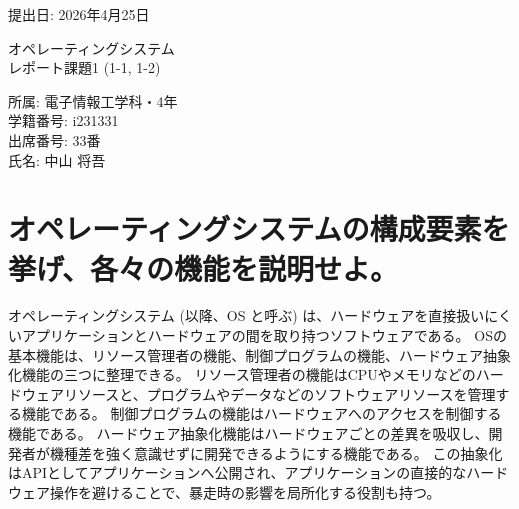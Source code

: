 \documentclass[a4paper,11pt,openany]{ltjsreport}
\begin{document}
\setcounter{page}{1}


% 

\begin{titlepage}
	\begin{flushright}
		{\large 提出日: 2026年4月25日}
	\end{flushright}
	\begin{center}
		{\huge オペレーティングシステム} \\
		\vspace{1cm}
		{\huge レポート課題1 (1-1, 1-2)}
	\end{center}
	\begin{center}
		{\large 所属: 電子情報工学科・4年} \\
		\vspace{0.5cm}
		{\large 学籍番号: i231331} \\
		\vspace{0.5cm}
		{\large 出席番号: 33番} \\
		\vspace{0.5cm}
		{\large 氏名: 中山 将吾}
	\end{center}
\end{titlepage}

\section{オペレーティングシステムの構成要素を挙げ、各々の機能を説明せよ。}

オペレーティングシステム (以降、OS と呼ぶ) は、ハードウェアを直接扱いにくいアプリケーションとハードウェアの間を取り持つソフトウェアである。
OSの基本機能は、リソース管理者の機能、制御プログラムの機能、ハードウェア抽象化機能の三つに整理できる。
リソース管理者の機能はCPUやメモリなどのハードウェアリソースと、プログラムやデータなどのソフトウェアリソースを管理する機能である。
制御プログラムの機能はハードウェアへのアクセスを制御する機能である。
ハードウェア抽象化機能はハードウェアごとの差異を吸収し、開発者が機種差を強く意識せずに開発できるようにする機能である。
この抽象化はAPIとしてアプリケーションへ公開され、アプリケーションの直接的なハードウェア操作を避けることで、暴走時の影響を局所化する役割も持つ。
\end{document}
